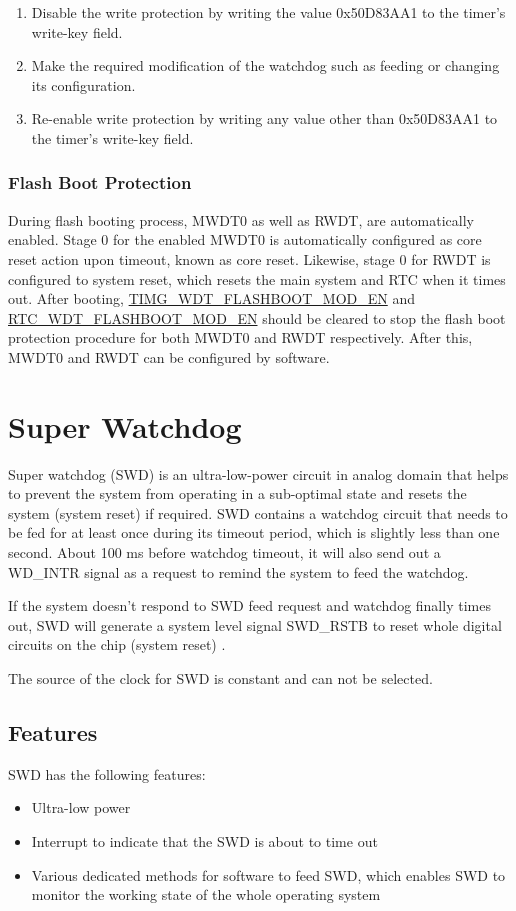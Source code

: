 \documentclass[main\_\_EN.tex]{subfiles}
\begin{document}
\begin{enumerate}
\item Disable the write protection by writing the value 0x50D83AA1 to the timer’s write-key field.
\item Make the required modification of the watchdog such as feeding or changing its configuration.
\item Re-enable write protection by writing any value other than 0x50D83AA1 to the timer’s write-key field.
\end{enumerate}

\subsubsection{Flash Boot Protection}
During flash booting process, MWDT0 as well as RWDT, are automatically enabled. Stage 0 for the enabled MWDT0 is automatically configured as core reset action upon timeout, known as core reset. Likewise, stage 0 for RWDT is configured to system reset, which resets the main system and RTC when it times out. After booting, \hyperref[fielddesc:TIMGWDTFLASHBOOTMODEN]{TIMG\_WDT\_FLASHBOOT\_MOD\_EN} and \hyperref[fielddesc:RTCWDTFLASHBOOTMODEN]{RTC\_WDT\_FLASHBOOT\_MOD\_EN}  should be cleared to stop the flash boot protection procedure for both MWDT0 and RWDT respectively. After this, MWDT0 and RWDT can be configured by software.


\section{Super Watchdog}\label{sec:wdt-swdt}
Super watchdog (SWD) is an ultra-low-power circuit in analog domain that helps to prevent the system from operating in a sub-optimal state and resets the system (system reset) if required. SWD contains a watchdog circuit that needs to be fed for at least once during its timeout period, which is slightly less than one second. About 100 ms before watchdog timeout, it will also send out a WD\_INTR signal as a request to remind the system to feed the watchdog.

If the system doesn’t respond to SWD feed request and watchdog finally times out, SWD will generate a system level signal SWD\_RSTB to reset whole digital circuits on the chip (system reset) .

The source of the clock for SWD is constant and can not be selected.

\subsection{Features}
SWD has the following features:
\begin{itemize}
    \item Ultra-low power
    \item Interrupt to indicate that the SWD is about to time out
    \item Various dedicated methods for software to feed SWD, which enables SWD to monitor the working state of the whole operating system
\end{itemize}
\end{document}
